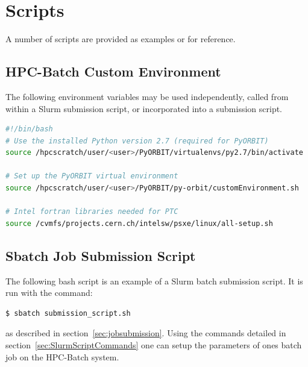 \documentclass[a4paper]{cernatsnote}
\begin{document}
\section{Scripts}
\label{sec:scripts}

A number of scripts are provided as examples or for reference.

\subsection{HPC-Batch Custom Environment}
\label{sec:environment_script}

The following environment variables may be used independently, called from within a Slurm submission script, or incorporated into a submission script.
	
\begin{lstlisting}[language=bash, belowskip=-3\medskipamount]
#!/bin/bash
# Use the installed Python version 2.7 (required for PyORBIT)
source /hpcscratch/user/<user>/PyORBIT/virtualenvs/py2.7/bin/activate

# Set up the PyORBIT virtual environment
source /hpcscratch/user/<user>/PyORBIT/py-orbit/customEnvironment.sh

# Intel fortran libraries needed for PTC
source /cvmfs/projects.cern.ch/intelsw/psxe/linux/all-setup.sh
\end{lstlisting}

	
\subsection{Sbatch Job Submission Script}	
\label{sec:JobSubmissionScript}

The following bash script is an example of a Slurm batch submission script. It is run with the command:
\begin{lstlisting}[language=bash, belowskip=-3\medskipamount]
$ sbatch submission_script.sh
\end{lstlisting}	
	
as described in section~\ref{sec:jobsubmission}. Using the commands detailed in section~\ref{sec:SlurmScriptCommands} one can setup the parameters of ones batch job on the HPC-Batch system.
	
\end{document}
